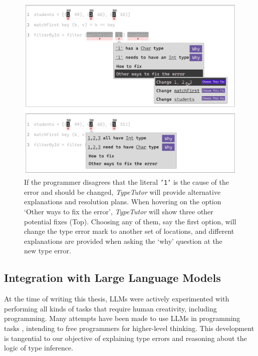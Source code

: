 \begin{figure}[hbt]
  \includegraphics[width=\linewidth]{WhatIf}
  \caption[An examples of \textit{TypeTutor} addressing alternative causes (`what-if' questions)]{
      \label{fig:what-if}
      If the programmer disagrees that the literal \texttt{'1'} is the cause of the error and should be changed, \textit{TypeTutor} will provide alternative explanations and resolution plans. When hovering on the option `Other ways to fix the error', \textit{TypeTutor} will show three other potential fixes (Top). Choosing any of them, say the first option, will change the type error mark to another set of locations, and different explanations are provided when asking the `why' question at the new type error.
    }
\end{figure}


\subsection{Integration with Large Language Models}
At the time of writing this thesis, LLMs were actively experimented with performing all kinds of tasks that require human creativity, including programming. Many attempts have been made to use LLMs in programming tasks \cite{Shi2024-bj}, intending to free programmers for higher-level thinking. This development is tangential to our objective of explaining type errors and reasoning about the logic of type inference. 

